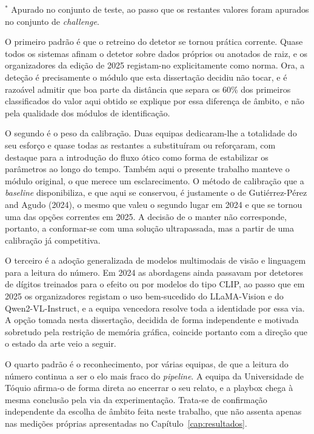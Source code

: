 \begin{table}[htbp]
\vspace{2mm}
{\footnotesize $^{*}$ Apurado no conjunto de teste, ao passo que os restantes valores
foram apurados no conjunto de \emph{challenge}.}
\end{table}

O primeiro padrão é que o retreino do detetor se tornou prática corrente. Quase todos os
sistemas afinam o detetor sobre dados próprios ou anotados de raiz, e os organizadores da
edição de 2025 registam-no explicitamente como norma. Ora, a deteção é precisamente o
módulo que esta dissertação decidiu não tocar, e é razoável admitir que boa parte da
distância que separa os 60\% dos primeiros classificados do valor aqui obtido se explique
por essa diferença de âmbito, e não pela qualidade dos módulos de identificação.

O segundo é o peso da calibração. Duas equipas dedicaram-lhe a totalidade do seu esforço e
quase todas as restantes a substituíram ou reforçaram, com destaque para a introdução do
fluxo ótico como forma de estabilizar os parâmetros ao longo do tempo. Também aqui o
presente trabalho manteve o módulo original, o que merece um esclarecimento. O método de
calibração que a \emph{baseline} disponibiliza, e que aqui se conservou, é justamente o de
Gutiérrez-Pérez and Agudo (2024), o mesmo que valeu o segundo lugar em 2024 e que se tornou
uma das opções correntes em 2025. A decisão de o manter não corresponde, portanto, a
conformar-se com uma solução ultrapassada, mas a partir de uma calibração já competitiva.

O terceiro é a adoção generalizada de modelos multimodais de visão e linguagem para a
leitura do número. Em 2024 as abordagens ainda passavam por detetores de dígitos treinados
para o efeito ou por modelos do tipo CLIP, ao passo que em 2025 os organizadores registam o
uso bem-sucedido do LLaMA-Vision e do Qwen2-VL-Instruct, e a equipa vencedora resolve toda a
identidade por essa via. A opção tomada nesta dissertação, decidida de forma independente e
motivada sobretudo pela restrição de memória gráfica, coincide portanto com a direção que o
estado da arte veio a seguir.

O quarto padrão é o reconhecimento, por várias equipas, de que a leitura do número continua
a ser o elo mais fraco do \emph{pipeline}. A equipa da Universidade de Tóquio afirma-o de
forma direta ao encerrar o seu relato, e a playbox chega à mesma conclusão pela via da
experimentação. Trata-se de confirmação independente da escolha de âmbito feita neste
trabalho, que não assenta apenas nas medições próprias apresentadas no
Capítulo~\ref{cap:resultados}.

